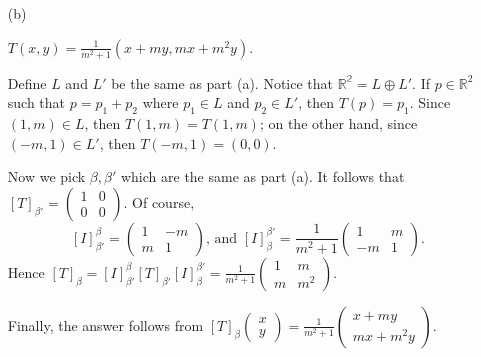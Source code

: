 \begin{Exercise}
\begin{enumerate}[(a)]
\item[(b)]
\begin{answer}
$T(x,y) = \frac{1}{m^2+1}\left(x+m y,m x+m^2 y\right)$.
\end{answer}
\begin{solution}
Define $L$ and $L'$ be the same as part (a). Notice that $\mathbb{R^2} = L\oplus L'$. If $p\in \mathbb{R}^2$ such that $p=p_1+p_2$ where $p_1\in L$ and $p_2\in L'$, then $T(p) = p_1$. Since $(1,m)\in L$, then $T(1,m) = T(1,m)$; on the other hand, since $(-m,1)\in L'$, then $T(-m,1) = (0,0)$. 

Now we pick $\beta,\beta'$ which are the same as part (a). It follows that $[T]_{\beta'} = \begin{pmatrix}
1 & 0 \\
0 & 0
\end{pmatrix}$. Of course, 
$$
[I]_{\beta'}^{\beta} = \begin{pmatrix}
1 & -m \\
m & 1
\end{pmatrix}\text{, and } [I]_{\beta}^{\beta'} = \frac{1}{m^2+1}\begin{pmatrix}
1 & m \\
-m & 1
\end{pmatrix}.
$$
Hence $[T]_{\beta} = [I]_{\beta'}^{\beta} [T]_{\beta'} [I]_{\beta}^{\beta'} = \frac{1}{m^2+1}\begin{pmatrix}
1 & m \\
m & m^2
\end{pmatrix}$. 

Finally, the answer follows from $[T]_{\beta}\begin{pmatrix}
x \\
y
\end{pmatrix} = \frac{1}{m^2+1}\begin{pmatrix}
x+m y \\
m x + m^2 y
\end{pmatrix}$.
\end{solution}

\end{enumerate}
\end{Exercise}